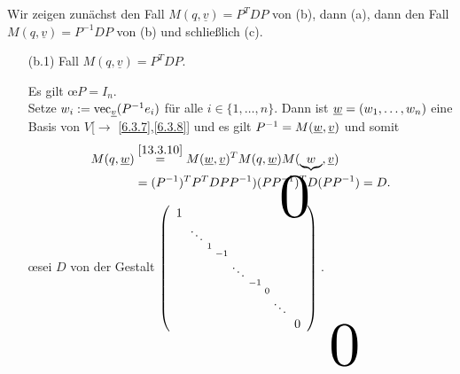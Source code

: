 \documentclass[../../main.tex]{subfiles}
\begin{document}
\begin{cproof}
    Wir zeigen zunächst den Fall $M(q,\underline{v})=P^T{DP}$ von (b), dann (a), dann den Fall $M(q,\underline{v})=P^{-1}DP$ von (b) und schließlich (c).\\
    \begin{itemize}
        \item[(b.1)] Fall $M(q,\underline{v})=P^T{DP}$. 
        \begin{behbox}
            \hbeh{}
                Es gilt \oe $P=I_n$. \\
            \hbeg{}
                Setze $w_i:=\operatorname{vec}_{{\underline v}}(P^{-1}e_i)$ für alle $i\in\{1,\ldots ,n\}$. Dann ist ${\underline w}=(w_1,\ldots ,w_n)$ eine Basis von $V$[$\to$ \ref{6.3.7},\ref{6.3.8}] und es gilt $P^{-1}=M({\underline w},{\underline v})$ und somit 
                \begin{align*}
                    M(q,\underline{w})&\stackrel{\ref{13.3.10}}{=}M(\underline{w},\underline{v})^TM(q,\underline{w})M(\underbrace{w},\underline{v})\\
                    &=(P^{-1})^TP^TDPP^{-1})(PP^{-1})^TD(PP^{-1})=D.
                \end{align*}
        \end{behbox}
        \begin{behbox}
            \hbeh{} 
                \oe sei $D$ von der Gestalt 
                $\left(
                    \begin{smallmatrix}
                        \tikz\node(c){$1$};\\
                        &\ddots\\
                        &&1\\
                        &&&-1\\
                        &&&&\ddots\\
                        &&&&&-1\\
                        &&&&&&0\\
                        &&&&&&&\ddots\\
                        &&&&&&&&\tikz\node(d){$0$};
                    \end{smallmatrix}
                \right)
                \begin{tikzpicture}[overlay]
                    \node[below right of = c,xshift=0em,yshift=-4em,scale=5]{$0$};
                    \node[above left of = d,xshift=0em,yshift=4em,scale=5]{$0$};
                \end{tikzpicture}$. \\

\end{behbox}
\end{itemize}
\end{cproof}
\end{document}
